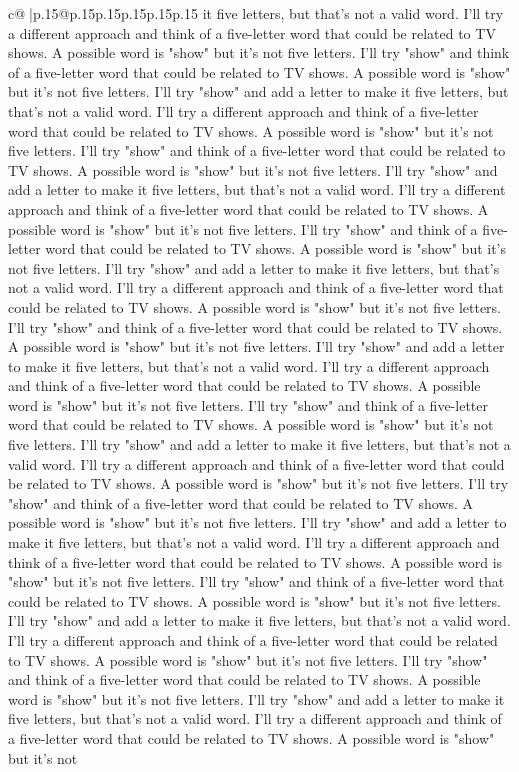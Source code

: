 \documentclass{article}
\begin{document}
{\begin{supertabular}{c@{$\;$}|p{.15\linewidth}@{}p{.15\linewidth}p{.15\linewidth}p{.15\linewidth}p{.15\linewidth}p{.15\linewidth}}
{{{it five letters, but that's not a valid word. I'll try a different approach and think of a five{-}letter word that could be related to TV shows. A possible word is "show" but it's not five letters. I'll try "show" and think of a five{-}letter word that could be related to TV shows. A possible word is "show" but it's not five letters. I'll try "show" and add a letter to make it five letters, but that's not a valid word. I'll try a different approach and think of a five{-}letter word that could be related to TV shows. A possible word is "show" but it's not five letters. I'll try "show" and think of a five{-}letter word that could be related to TV shows. A possible word is "show" but it's not five letters. I'll try "show" and add a letter to make it five letters, but that's not a valid word. I'll try a different approach and think of a five{-}letter word that could be related to TV shows. A possible word is "show" but it's not five letters. I'll try "show" and think of a five{-}letter word that could be related to TV shows. A possible word is "show" but it's not five letters. I'll try "show" and add a letter to make it five letters, but that's not a valid word. I'll try a different approach and think of a five{-}letter word that could be related to TV shows. A possible word is "show" but it's not five letters. I'll try "show" and think of a five{-}letter word that could be related to TV shows. A possible word is "show" but it's not five letters. I'll try "show" and add a letter to make it five letters, but that's not a valid word. I'll try a different approach and think of a five{-}letter word that could be related to TV shows. A possible word is "show" but it's not five letters. I'll try "show" and think of a five{-}letter word that could be related to TV shows. A possible word is "show" but it's not five letters. I'll try "show" and add a letter to make it five letters, but that's not a valid word. I'll try a different approach and think of a five{-}letter word that could be related to TV shows. A possible word is "show" but it's not five letters. I'll try "show" and think of a five{-}letter word that could be related to TV shows. A possible word is "show" but it's not five letters. I'll try "show" and add a letter to make it five letters, but that's not a valid word. I'll try a different approach and think of a five{-}letter word that could be related to TV shows. A possible word is "show" but it's not five letters. I'll try "show" and think of a five{-}letter word that could be related to TV shows. A possible word is "show" but it's not five letters. I'll try "show" and add a letter to make it five letters, but that's not a valid word. I'll try a different approach and think of a five{-}letter word that could be related to TV shows. A possible word is "show" but it's not five letters. I'll try "show" and think of a five{-}letter word that could be related to TV shows. A possible word is "show" but it's not five letters. I'll try "show" and add a letter to make it five letters, but that's not a valid word. I'll try a different approach and think of a five{-}letter word that could be related to TV shows. A possible word is "show" but it's not }}}
\end{supertabular}}
\end{document}
